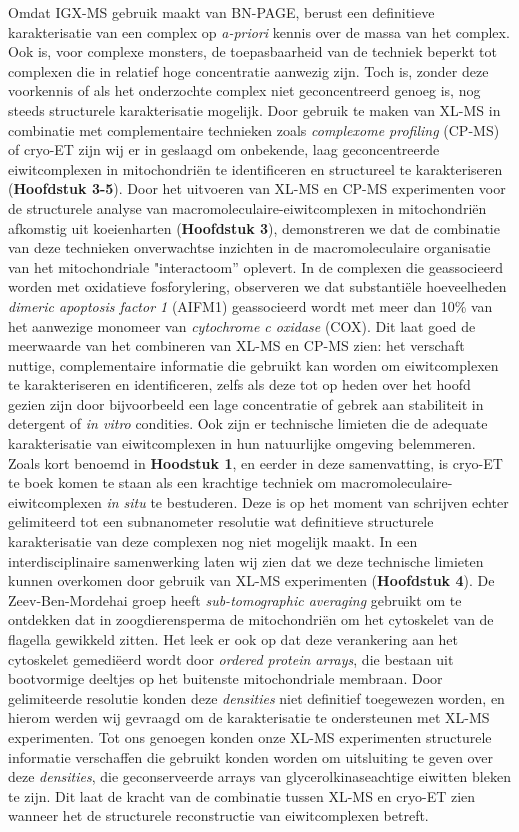 Omdat IGX-MS gebruik maakt van BN-PAGE, berust een definitieve karakterisatie van een complex op \emph{a-priori} kennis over de massa van het complex. Ook is, voor complexe monsters, de toepasbaarheid van de techniek beperkt tot complexen die in relatief hoge concentratie aanwezig zijn.
Toch is, zonder deze voorkennis of als het onderzochte complex niet geconcentreerd genoeg is, nog steeds structurele karakterisatie mogelijk. Door gebruik te maken van XL-MS in combinatie met complementaire technieken zoals \emph{complexome profiling} (CP-MS) of cryo-ET zijn wij er in geslaagd om onbekende, laag geconcentreerde eiwitcomplexen in mitochondriën te identificeren en structureel te karakteriseren (\textbf{Hoofdstuk 3-5}). Door het uitvoeren van XL-MS en CP-MS experimenten voor de structurele analyse van macromoleculaire-eiwitcomplexen in mitochondriën afkomstig uit koeienharten (\textbf{Hoofdstuk 3}), demonstreren we dat de combinatie van deze technieken onverwachtse inzichten in de macromoleculaire organisatie van het mitochondriale "interactoom” oplevert. In de complexen die geassocieerd worden met oxidatieve fosforylering, observeren we dat substantiële hoeveelheden \emph{dimeric apoptosis factor 1} (AIFM1) geassocieerd wordt met meer dan 10\% van het aanwezige monomeer van \emph{cytochrome c oxidase} (COX). Dit laat goed de meerwaarde van het combineren van XL-MS en CP-MS zien: het verschaft nuttige, complementaire informatie die gebruikt kan worden om eiwitcomplexen te karakteriseren en identificeren, zelfs als deze tot op heden over het hoofd gezien zijn door bijvoorbeeld een lage concentratie of gebrek aan stabiliteit in detergent of \emph{in vitro} condities.
Ook zijn er technische limieten die de adequate karakterisatie van eiwitcomplexen in hun natuurlijke omgeving belemmeren. Zoals kort benoemd in \textbf{Hoodstuk 1}, en eerder in deze samenvatting, is cryo-ET te boek komen te staan als een krachtige techniek om macromoleculaire-eiwitcomplexen \emph{in situ} te bestuderen. Deze is op het moment van schrijven echter gelimiteerd tot een subnanometer resolutie wat definitieve structurele karakterisatie van deze complexen nog niet mogelijk maakt. In een interdisciplinaire samenwerking laten wij zien dat we deze technische limieten kunnen overkomen door gebruik van XL-MS experimenten (\textbf{Hoofdstuk 4}). De Zeev-Ben-Mordehai groep heeft \emph{sub-tomographic averaging} gebruikt om te ontdekken dat in zoogdierensperma de mitochondriën om het cytoskelet van de flagella gewikkeld zitten. Het leek er ook op dat deze verankering aan het cytoskelet gemediëerd wordt door \emph{ordered protein arrays}, die bestaan uit bootvormige deeltjes op het buitenste mitochondriale membraan. Door gelimiteerde resolutie konden deze \emph{densities} niet definitief toegewezen worden, en hierom werden wij gevraagd om de karakterisatie te ondersteunen met XL-MS experimenten. Tot ons genoegen konden onze XL-MS experimenten structurele informatie verschaffen die gebruikt konden worden om uitsluiting te geven over deze \emph{densities}, die geconserveerde arrays van glycerolkinaseachtige eiwitten bleken te zijn. Dit laat de kracht van de combinatie tussen XL-MS en cryo-ET zien wanneer het de structurele reconstructie van eiwitcomplexen betreft.
